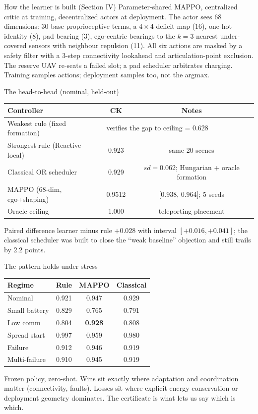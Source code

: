 \documentclass[aspectratio=169,10pt]{beamer}
\begin{document}
\begin{frame}{How the learner is built (Section IV)}
  \small
  Parameter-shared MAPPO, centralized critic at training, decentralized actors at deployment. The actor sees 68 dimensions: 30 base proprioceptive terms, a $4\times4$ deficit map (16), one-hot identity (8), pad bearing (3), ego-centric bearings to the $k=3$ nearest under-covered sensors with neighbour repulsion (11). All six actions are masked by a safety filter with a 3-step connectivity lookahead and articulation-point exclusion. The reserve UAV re-seats a failed slot; a pad scheduler arbitrates charging. Training samples actions; deployment samples too, not the argmax.
\end{frame}

\begin{frame}{The head-to-head (nominal, held-out)}
  \small
  \begin{center}
  \begin{tabular}{lcc}
    \toprule
    Controller & CK & Notes \\
    \midrule
    Weakest rule (fixed formation) & \multicolumn{2}{l}{verifies the gap to ceiling = 0.628} \\
    Strongest rule (Reactive-local) & 0.923 & same 20 scenes \\
    Classical OR scheduler & 0.929 & $sd=0.062$; Hungarian + oracle formation \\
    MAPPO (68-dim, ego+shaping) & 0.9512 & [0.938, 0.964]; 5 seeds \\
    Oracle ceiling & 1.000 & teleporting placement \\
    \bottomrule
  \end{tabular}
  \end{center}
  \footnotesize Paired difference learner minus rule $+0.028$ with interval $[+0.016,+0.041]$; the classical scheduler was built to close the ``weak baseline'' objection and still trails by 2.2 points.
\end{frame}

\begin{frame}{The pattern holds under stress}
  \small
  \begin{tabular}{lccc}
    \toprule
    Regime & Rule & MAPPO & Classical \\
    \midrule
    Nominal & 0.921 & 0.947 & 0.929 \\
    Small battery & 0.829 & 0.765 & 0.791 \\
    Low comm & 0.804 & \textbf{0.928} & 0.808 \\
    Spread start & 0.997 & 0.959 & 0.980 \\
    Failure & 0.912 & 0.946 & 0.919 \\
    Multi-failure & 0.910 & 0.945 & 0.919 \\
    \bottomrule
  \end{tabular}
  \vspace{0.12cm}
  \footnotesize Frozen policy, zero-shot. Wins sit exactly where adaptation and coordination matter (connectivity, faults). Losses sit where explicit energy conservation or deployment geometry dominates. The certificate is what lets us say which is which.
\end{frame}
\end{document}
